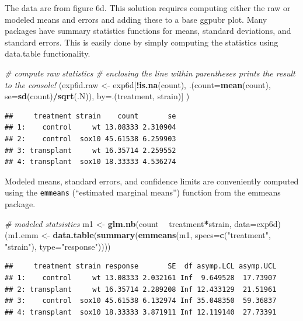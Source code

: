 \documentclass[]{book}
\newenvironment{Shaded}{\begin{snugshade}}{\end{snugshade}}
\newcommand{\KeywordTok}[1]{\textcolor[rgb]{0.13,0.29,0.53}{\textbf{#1}}}
\newcommand{\DataTypeTok}[1]{\textcolor[rgb]{0.13,0.29,0.53}{#1}}
\newcommand{\StringTok}[1]{\textcolor[rgb]{0.31,0.60,0.02}{#1}}
\newcommand{\CommentTok}[1]{\textcolor[rgb]{0.56,0.35,0.01}{\textit{#1}}}
\newcommand{\OperatorTok}[1]{\textcolor[rgb]{0.81,0.36,0.00}{\textbf{#1}}}
\newcommand{\NormalTok}[1]{#1}
\begin{document}
The data are from figure 6d. This solution requires computing either the
raw or modeled means and errors and adding these to a base ggpubr plot.
Many packages have summary statistics functions for means, standard
deviations, and standard errors. This is easily done by simply computing
the statistics using data.table functionality.

\begin{Shaded}
\begin{Highlighting}[]
\CommentTok{# compute raw statistics}
\CommentTok{# enclosing the line within parentheses prints the result to the console!}
\NormalTok{(exp6d.raw <-}\StringTok{ }\NormalTok{exp6d[}\OperatorTok{!}\KeywordTok{is.na}\NormalTok{(count), .(}\DataTypeTok{count=}\KeywordTok{mean}\NormalTok{(count),}
                       \DataTypeTok{se=}\KeywordTok{sd}\NormalTok{(count)}\OperatorTok{/}\KeywordTok{sqrt}\NormalTok{(.N)),}
                   \DataTypeTok{by=}\NormalTok{.(treatment, strain)]}
\NormalTok{)}
\end{Highlighting}
\end{Shaded}

\begin{verbatim}
##     treatment strain    count       se
## 1:    control     wt 13.08333 2.310904
## 2:    control  sox10 45.61538 6.259903
## 3: transplant     wt 16.35714 2.259552
## 4: transplant  sox10 18.33333 4.536274
\end{verbatim}

Modeled means, standard errors, and confidence limits are conveniently
computed using the \texttt{emmeans} (``estimated marginal means'')
function from the emmeans package.

\begin{Shaded}
\begin{Highlighting}[]
\CommentTok{# modeled statsistics}
\NormalTok{m1 <-}\StringTok{ }\KeywordTok{glm.nb}\NormalTok{(count }\OperatorTok{~}\StringTok{ }\NormalTok{treatment}\OperatorTok{*}\NormalTok{strain, }\DataTypeTok{data=}\NormalTok{exp6d)}
\NormalTok{(m1.emm <-}\StringTok{ }\KeywordTok{data.table}\NormalTok{(}\KeywordTok{summary}\NormalTok{(}\KeywordTok{emmeans}\NormalTok{(m1, }\DataTypeTok{specs=}\KeywordTok{c}\NormalTok{(}\StringTok{"treatment"}\NormalTok{, }\StringTok{"strain"}\NormalTok{), }\DataTypeTok{type=}\StringTok{"response"}\NormalTok{))))}
\end{Highlighting}
\end{Shaded}

\begin{verbatim}
##     treatment strain response       SE  df asymp.LCL asymp.UCL
## 1:    control     wt 13.08333 2.032161 Inf  9.649528  17.73907
## 2: transplant     wt 16.35714 2.289208 Inf 12.433129  21.51961
## 3:    control  sox10 45.61538 6.132974 Inf 35.048350  59.36837
## 4: transplant  sox10 18.33333 3.871911 Inf 12.119140  27.73391
\end{verbatim}
\end{document}
